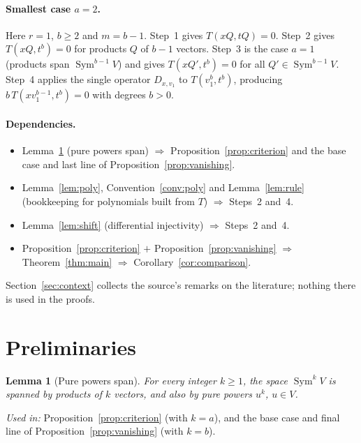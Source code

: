\documentclass[11pt]{article}
\newtheorem{lemma}[theorem]{Lemma}
\theoremstyle{definition}
\theoremstyle{remark}
\DeclareMathOperator{\Sym}{Sym}
\newcommand{\D}[2]{D_{#1,#2}}
\begin{document}
\paragraph{Smallest case $a=2$.}
Here $r=1$, $b\ge2$ and $m=b-1$. Step~1 gives $T(xQ,tQ)=0$. Step~2 gives
$T(xQ,t^b)=0$ for products $Q$ of $b-1$ vectors. Step~3 is the case $a=1$
(products span $\Sym^{b-1}V$) and gives $T(xQ',t^b)=0$ for all
$Q'\in\Sym^{b-1}V$. Step~4 applies the single operator $\D x{v_1}$ to
$T(v_1^b,t^b)$, producing $b\,T(xv_1^{b-1},t^b)=0$ with degrees $b>0$.

\paragraph{Dependencies.}
\begin{itemize}[nosep]
\item Lemma~\ref{lem:span} (pure powers span) $\Rightarrow$
Proposition~\ref{prop:criterion} and the base case and last line of
Proposition~\ref{prop:vanishing}.
\item Lemma~\ref{lem:poly}, Convention~\ref{conv:poly} and
Lemma~\ref{lem:rule} (bookkeeping for polynomials built from $T$)
$\Rightarrow$ Steps~2 and~4.
\item Lemma~\ref{lem:shift} (differential injectivity) $\Rightarrow$
Steps~2 and~4.
\item Proposition~\ref{prop:criterion} $+$ Proposition~\ref{prop:vanishing}
$\Rightarrow$ Theorem~\ref{thm:main} $\Rightarrow$
Corollary~\ref{cor:comparison}.
\end{itemize}
Section~\ref{sec:context} collects the source's remarks on the literature;
nothing there is used in the proofs.

\section{Preliminaries}\label{sec:prelim}

\begin{lemma}[Pure powers span]\label{lem:span}
For every integer $k\ge1$, the space $\Sym^kV$ is spanned by products of
$k$ vectors, and also by pure powers $u^k$, $u\in V$.
\end{lemma}

\noindent\emph{Used in:} Proposition~\ref{prop:criterion} (with $k=a$), and
the base case and final line of Proposition~\ref{prop:vanishing} (with
$k=b$).
\end{document}
